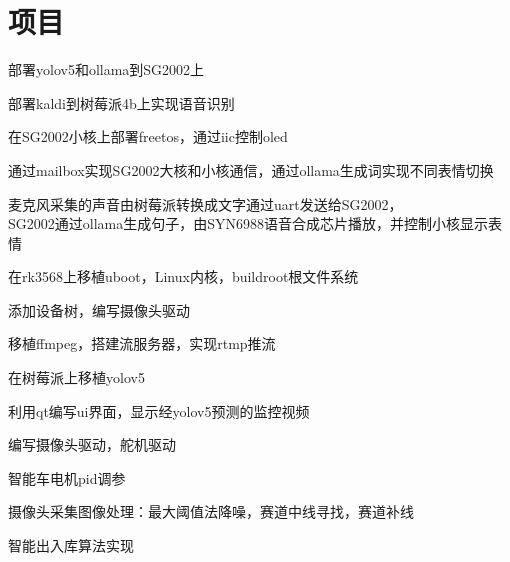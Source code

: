 \documentclass[]{deedy-resume-openfont}
\begin{document}
\begin{minipage}[t]{0.73\textwidth}
\section{项目}
\sectionsep
{}
\begin{tightemize}
    \item 部署yolov5和ollama到SG2002上
    \item 部署kaldi到树莓派4b上实现语音识别
    \item 在SG2002小核上部署freetos，通过iic控制oled
    \item 通过mailbox实现SG2002大核和小核通信，通过ollama生成词实现不同表情切换
    \item 麦克风采集的声音由树莓派转换成文字通过uart发送给SG2002，
    \\SG2002通过ollama生成句子，由SYN6988语音合成芯片播放，并控制小核显示表情
    \end{tightemize}
\sectionsep

\begin{tightemize}
    \item 在rk3568上移植uboot，Linux内核，buildroot根文件系统
    \item 添加设备树，编写摄像头驱动
    \item 移植ffmpeg，搭建流服务器，实现rtmp推流
    \item 在树莓派上移植yolov5
    \item 利用qt编写ui界面，显示经yolov5预测的监控视频
    \end{tightemize}
\sectionsep

\begin{tightemize}
    \item 编写摄像头驱动，舵机驱动
    \item 智能车电机pid调参
    \item 摄像头采集图像处理：最大阈值法降噪，赛道中线寻找，赛道补线
    \item 智能出入库算法实现
    \end{tightemize}
\sectionsep


\end{minipage}
\end{document}
